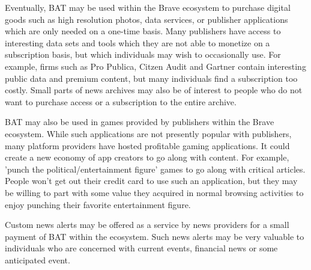 \documentclass[11pt]{article}
\begin{document}
Eventually, \textrm{BAT} may be used within the Brave ecosystem to purchase digital goods such as high resolution photos, data services, or publisher applications which are only needed on a one-time basis. Many publishers have access to interesting data sets and tools which they are not able to monetize on a subscription basis, but which individuals may wish to occasionally use. For example, firms such as Pro Publica, Citzen Audit and Gartner contain interesting public data and premium content, but many individuals find a subscription too costly. Small parts of news archives may also be of interest to people who do not want to purchase access or a subscription to the entire archive.

\textrm{BAT} may also be used in games provided by publishers within the Brave ecosystem. While such applications are not presently popular with publishers, many platform providers have hosted profitable gaming applications. It could create a new economy of app creators to go along with content. For example, 'punch the political/entertainment figure' games to go along with critical articles. People won't get out their credit card to use such an application, but they may be willing to part with some value they acquired in normal browsing activities to enjoy punching their favorite entertainment figure.

Custom news alerts may be offered as a service by news providers for a small payment of \textrm{BAT} within the ecosystem. Such news alerts may be very valuable to individuals who are concerned with current events, financial news or some anticipated event.
\end{document}

